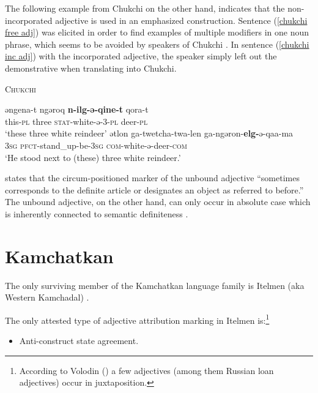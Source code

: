 The following example from Chukchi on the other hand, indicates that the non-incorporated adjective is used in an emphasized construction. Sentence (\ref{chukchi free adj}) was elicited in order to find examples of multiple modifiers in one noun phrase, which seems to be avoided by speakers of Chukchi \cite[330]{rijkhoff2002}. In sentence (\ref{chukchi inc adj}) with the incorporated adjective, the speaker simply left out the demonstrative when translating into Chukchi.
\begin{exe}
\ex \textsc{Chukchi} \cite[330]{rijkhoff2002}
\begin{xlist}
\ex \label{chukchi free adj}
\gll	əngena-t ngəroq \textbf{n-ilg-ə-qine-t} qora-t\\
	this-\textsc{pl} three \textsc{stat}-white-ə-3-\textsc{pl} deer-\textsc{pl}\\
\glt	‘these three white reindeer’
\ex \label{chukchi inc adj}
\gll	ətlon ga-twetcha-twa-len ga-ngəron-\textbf{elg-}ə-qaa-ma\\
	\textsc{3sg} \textsc{pfct}-stand\_up-be-\textsc{3sg} \textsc{com}-white-ə-deer-\textsc{com}\\
\glt	‘He stood next to (these) three white reindeer.’
\end{xlist}
\end{exe}
\citet[716]{bogoras1922} states that the circum-positioned marker of the unbound adjective “sometimes corresponds to the definite article or designates an object as referred to before.” The unbound adjective, on the other hand, can only occur in absolute case which is inherently connected to semantic definiteness \citep[cf.][207, elsewhere]{dunn1999}.


\section{Kamchatkan}
The only surviving member of the Kamchatkan language family is Itelmen (aka Western Kamchadal) \citep[224]{salminen2007}.

The only attested type of adjective attribution marking in Itelmen is:\footnote{According to Volodin (\citeyear{volodin1997}) a few adjectives (among them Russian loan adjectives) occur in juxtaposition.}
\begin{itemize}
\item Anti-construct state agreement.
\end{itemize}

